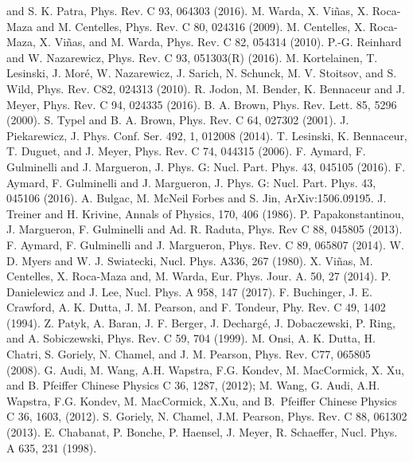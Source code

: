 \documentclass
[aps,prc,twocolumn,showpacs,showkeys,amsmath,floatfix,superscriptaddress]{revtex4}
\begin{document}
{{\begin{thebibliography}{}
and S. K. Patra, Phys. Rev. C 93, 064303 (2016).
 M. Warda, X. Vi\~nas, X. Roca-Maza and M. Centelles, Phys. Rev. C 80, 024316 (2009).
 M. Centelles, X. Roca-Maza, X. Vi\~nas, and M. Warda, Phys. Rev. C 82, 054314 (2010).
 P.-G. Reinhard and W. Nazarewicz, Phys. Rev. C 93, 051303(R) (2016).
 M. Kortelainen, T. Lesinski, J. Mor\'e, W. Nazarewicz, J. Sarich, N. Schunck, M. V. Stoitsov, and S. Wild,
Phys. Rev. C82, 024313 (2010).
 R. Jodon, M. Bender, K. Bennaceur and J. Meyer, Phys. Rev. C 94, 024335 (2016).
 B. A. Brown, Phys. Rev. Lett. 85, 5296 (2000).
 S. Typel and B. A. Brown, Phys. Rev. C 64, 027302 (2001).
 J. Piekarewicz, J. Phys. Conf. Ser. 492, 1, 012008 (2014).
 T. Lesinski, K. Bennaceur, T. Duguet, and J. Meyer, Phys. Rev. C 74, 044315 (2006).
 F. Aymard, F. Gulminelli and J. Margueron, J. Phys. G: Nucl. Part. Phys. 43, 045105 (2016).
 F. Aymard, F. Gulminelli and J. Margueron,  J. Phys. G: Nucl. Part. Phys. 43, 045106 (2016).
 A. Bulgac, M. McNeil Forbes and S. Jin, ArXiv:1506.09195.
 J. Treiner and H. Krivine, Annals of Physics, 170, 406 (1986).
 P. Papakonstantinou, J. Margueron, F. Gulminelli and Ad. R. Raduta, Phys. Rev C 88, 045805 (2013).
 F. Aymard, F. Gulminelli and J. Margueron, Phys. Rev. C 89, 065807 (2014).
 W. D. Myers and W. J. Swiatecki, Nucl. Phys. A336, 267 (1980).
 X. Vi\~nas, M. Centelles, X. Roca-Maza and, M. Warda, Eur. Phys. Jour. A. 50, 27 (2014).
 P. Danielewicz and J. Lee, Nucl. Phys. A 958, 147 (2017).
 F. Buchinger, J. E. Crawford, A. K. Dutta, J. M. Pearson, and F. Tondeur, Phy. Rev. C 49, 1402 (1994).
 Z. Patyk, A. Baran, J. F. Berger, J. Decharg\'e, J. Dobaczewski, P. Ring, and A. Sobiczewski,
  Phys. Rev. C 59, 704 (1999).
 M. Onsi, A. K. Dutta, H. Chatri, S. Goriely, N. Chamel, and J. M. Pearson, Phys. Rev. C77, 065805 (2008).
 G. Audi, M. Wang, A.H. Wapstra, F.G. Kondev, M. MacCormick, X. Xu, and B. Pfeiffer
           Chinese Physics C 36, 1287, (2012);
           M. Wang, G. Audi, A.H. Wapstra, F.G. Kondev, M. MacCormick, X.Xu, and B.~Pfeiffer
           Chinese Physics C 36, 1603, (2012).
 S. Goriely, N. Chamel, J.M. Pearson, Phys. Rev. C 88, 061302 (2013).
 E. Chabanat, P. Bonche, P. Haensel, J. Meyer, R. Schaeffer, Nucl. Phys. A 635, 231 (1998).

\end{thebibliography}}}
\end{document}
